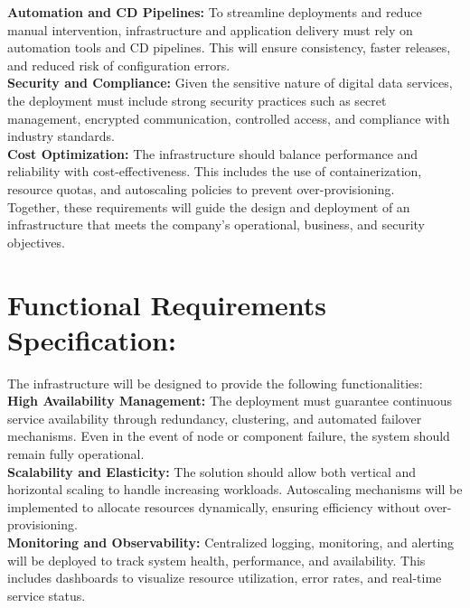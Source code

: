 \documentclass[a4paper,12pt]{report}
\begin{document}
\begin{doublespace}
\textbf{Automation and CD Pipelines:}  
To streamline deployments and reduce manual intervention, infrastructure and application delivery must rely on automation tools and CD pipelines. This will ensure consistency, faster releases, and reduced risk of configuration errors. \\

\textbf{Security and Compliance:}  
Given the sensitive nature of digital data services, the deployment must include strong security practices such as secret management, encrypted communication, controlled access, and compliance with industry standards. \\

\textbf{Cost Optimization:}  
The infrastructure should balance performance and reliability with cost-effectiveness. This includes the use of containerization, resource quotas, and autoscaling policies to prevent over-provisioning. \\

Together, these requirements will guide the design and deployment of an infrastructure that meets the company’s operational, business, and security objectives.
\end{doublespace}

\section{Functional Requirements Specification:}
\hspace{1cm}The infrastructure will be designed to provide the following functionalities: \\

\textbf{High Availability Management:}  
The deployment must guarantee continuous service availability through redundancy, clustering, and automated failover mechanisms. Even in the event of node or component failure, the system should remain fully operational. \\

\textbf{Scalability and Elasticity:}  
The solution should allow both vertical and horizontal scaling to handle increasing workloads. Autoscaling mechanisms will be implemented to allocate resources dynamically, ensuring efficiency without over-provisioning. \\

\textbf{Monitoring and Observability:}  
Centralized logging, monitoring, and alerting will be deployed to track system health, performance, and availability. This includes dashboards to visualize resource utilization, error rates, and real-time service status. \\
\end{document}
